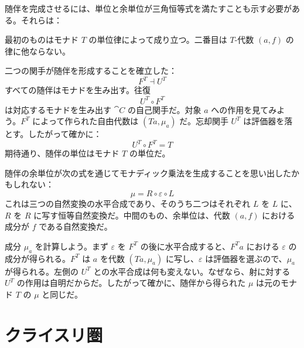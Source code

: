 随伴を完成させるには、単位と余単位が三角恒等式を満たすことも示す必要がある。それらは：

\begin{figure}[H]
  \centering
  \begin{subfigure}
    \centering
  \end{subfigure}%
  \hspace{1cm}
  \begin{subfigure}
    \centering
  \end{subfigure}
\end{figure}

\noindent
最初のものはモナド $T$ の単位律によって成り立つ。二番目は $T$-代数 $(a, f)$ の律に他ならない。

二つの関手が随伴を形成することを確立した：
\[F^T \dashv U^T\]
すべての随伴はモナドを生み出す。往復
\[U^T \circ F^T\]
は対応するモナドを生み出す $\cat{C}$ の自己関手だ。対象 $a$ への作用を見てみよう。$F^T$ によって作られた自由代数は $(T a, \mu_a)$ だ。忘却関手 $U^T$ は評価器を落とす。したがって確かに：
\[U^T \circ F^T = T\]
期待通り、随伴の単位はモナド $T$ の単位だ。

随伴の余単位が次の式を通じてモナディック乗法を生成することを思い出したかもしれない：
\[\mu = R \circ \varepsilon \circ L\]
これは三つの自然変換の水平合成であり、そのうち二つはそれぞれ $L$ を $L$ に、$R$ を $R$ に写す恒等自然変換だ。中間のもの、余単位は、代数 $(a, f)$ における成分が $f$ である自然変換だ。

成分 $\mu_a$ を計算しよう。まず $\varepsilon$ を $F^T$ の後に水平合成すると、$F^T a$ における $\varepsilon$ の成分が得られる。$F^T$ は $a$ を代数 $(T a, \mu_a)$ に写し、$\varepsilon$ は評価器を選ぶので、$\mu_a$ が得られる。左側の $U^T$ との水平合成は何も変えない。なぜなら、射に対する $U^T$ の作用は自明だからだ。したがって確かに、随伴から得られた $\mu$ は元のモナド $T$ の $\mu$ と同じだ。

\section{クライスリ圏}

